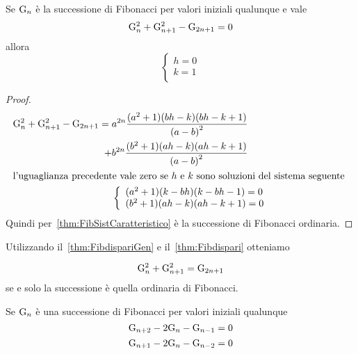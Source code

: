 \begin{thm}[Dispari]\label{thm:FibdispariGen}
	Se $\mathrm{G}_{n}$ è la successione di Fibonacci per valori iniziali qualunque e 
	vale 
	\begin{equation}
		\mathrm{G}_{n}^2+\mathrm{G}_{n+1}^2-\mathrm{G}_{2n+1}=0 
	\end{equation}\label{eqn:FibDispariGen} allora 
\[\begin{cases}
	h=0\\
	k=1\\
\end{cases}\]
\end{thm}
\begin{proof}
\begin{align*}
\mathrm{G}_{n}^2+\mathrm{G}_{n+1}^2-\mathrm{G}_{2n+1}={}&a^{2n}\dfrac{(a^2+1)(bh-k)(bh-k+1)}{\left(a-b\right)^2}\\
+&b^{2n}\dfrac{(b^2+1)(ah-k)(ah-k+1)}{\left(a-b\right)^2}\\
\intertext{l'uguaglianza precedente vale zero se $h$ e $k$ sono soluzioni del sistema seguente }
&	\left\{
\begin{array}{l}
	(a^2+1)(k-bh)(k-bh-1)=0\\
	(b^2+1)(ah-k)(ah-k+1)=0
\end{array}
\right.\\
\end{align*}
Quindi per~\vref{thm:FibSistCaratteristico} è la successione di Fibonacci ordinaria.
\end{proof}
Utilizzando il~\vref{thm:FibdispariGen} e il~\vref{thm:Fibdispari} otteniamo
\begin{thm}[Unicità]
	\begin{equation}
		\mathrm{G}_{n}^2+\mathrm{G}_{n+1}^2=\mathrm{G}_{2n+1} 
	\end{equation} se e solo la successione è quella ordinaria di Fibonacci. 
\end{thm}
\begin{thm}[Proprietà]
	Se $\mathrm{G}_{n}$ è una  successione di Fibonacci per valori iniziali qualunque
	\begin{equation}
		\mathrm{G}_{n+2}-2\mathrm{G}_{n}-\mathrm{G}_{n-1}=0 
	\end{equation} 
\begin{equation}
	\mathrm{G}_{n+1}-2\mathrm{G}_{n}-\mathrm{G}_{n-2}=0 
\end{equation} 
\end{thm}~\cite{Horadam_1961}

